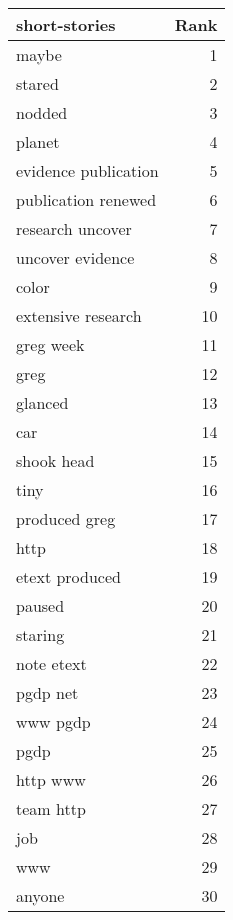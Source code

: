 \begin{table}
\label{tab:short-stories_terms}
\begin{tabular}{lr}
\toprule
short-stories & Rank \\
\midrule
maybe & 1 \\
stared & 2 \\
nodded & 3 \\
planet & 4 \\
evidence publication & 5 \\
publication renewed & 6 \\
research uncover & 7 \\
uncover evidence & 8 \\
color & 9 \\
extensive research & 10 \\
greg week & 11 \\
greg & 12 \\
glanced & 13 \\
car & 14 \\
shook head & 15 \\
tiny & 16 \\
produced greg & 17 \\
http & 18 \\
etext produced & 19 \\
paused & 20 \\
staring & 21 \\
note etext & 22 \\
pgdp net & 23 \\
www pgdp & 24 \\
pgdp & 25 \\
http www & 26 \\
team http & 27 \\
job & 28 \\
www & 29 \\
anyone & 30 \\
\bottomrule
\end{tabular}
\end{table}
